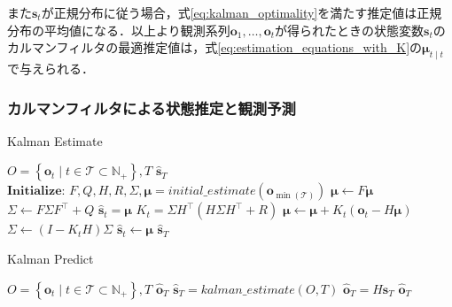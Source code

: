         また$\bm{s}_t$が正規分布に従う場合，式\ref{eq:kalman_optimality}を満たす推定値は正規分布の平均値になる．以上より観測系列$\bm{o}_1, \dots, \bm{o}_t$が得られたときの状態変数$\bm{s}_t$のカルマンフィルタの最適推定値は，式\ref{eq:estimation_equations_with_K}の$\bm{\mu}_{t \mid t}$で与えられる．

        \subsubsection{カルマンフィルタによる状態推定と観測予測}

        \begin{algorithm}[t]
            \caption[Kalman Estimate]{Kalman Estimate}
            \label{alg:kalman_estimate}
            \begin{algorithmic}[1]
                \Require $O = \left\{\bm{o}_t \mid t \in \mathcal{T} \subset \mathbb{N}_+\right\}, T$
                \Ensure $\hat{\bm{s}}_T$
                \State $\textbf{Initialize: } F, Q, H, R, \Sigma, \bm{\mu} = initial\_estimate(\bm{o}_{\min(\mathcal{T})})$
                    \State $\bm{\mu} \gets F \bm{\mu}$
                    \State $\Sigma \gets F \Sigma F^{\top} + Q$
                    \State $\hat{\bm{s}}_t = \bm{\mu}$
                        \State $K_t = \Sigma H^{\top} \left( H \Sigma H^{\top} + R\right)$
                        \State $\bm{\mu} \gets \bm{\mu} + K_t \left( \bm{o}_t - H \bm{\mu} \right)$
                        \State $\Sigma \gets \left( I - K_t H \right) \Sigma$
                        \State $\hat{\bm{s}}_t \gets \bm{\mu}$
                    \EndIf
                \EndFor
                \State \Return $\hat{\bm{s}}_T$
            \end{algorithmic}
        \end{algorithm}

        \begin{algorithm}[t]
            \caption[Kalman Predict]{Kalman Predict}
            \label{alg:kalman_predict}
            \begin{algorithmic}[1]
                \Require $O = \left\{\bm{o}_t \mid t \in \mathcal{T} \subset \mathbb{N}_+\right\}, T$
                \Ensure $\hat{\bm{o}}_T$
                \State $\hat{\bm{s}}_T = kalman\_estimate(O, T)$
                \State $\hat{\bm{o}}_T = H \hat{\bm{s}}_T$
                \State \Return $\hat{\bm{o}}_T$
            \end{algorithmic}
        \end{algorithm}


